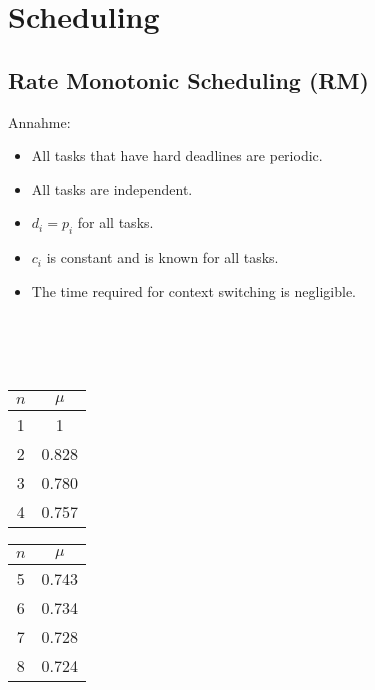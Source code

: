 \section{Scheduling}

\subsection{Rate Monotonic Scheduling (RM)}

Annahme:

\begin{itemize}
    \itemsep-.5em 
    \item All tasks that have hard deadlines are periodic.
    \item All tasks are independent.
    \item $d_i = p_i$ for all tasks.
    \item $c_i$ is constant and is known for all tasks.
    \item The time required for context switching is negligible.
\end{itemize}

\begin{minipage}[t]{.49\linewidth}
    \vspace{0pt}

    \\
    \\
    \\
\end{minipage}\hfill
\begin{minipage}[t]{.25\linewidth}
    \vspace{0pt}
    \begin{tabular}{ c|c }
        $n$ & $\mu$ \\
        \hline
        1 & 1     \\
        2 & 0.828 \\  
        3 & 0.780 \\
        4 & 0.757 \\
       \end{tabular}
\end{minipage}\hfill
\begin{minipage}[t]{.25\linewidth}
    \vspace{0pt}
    \begin{tabular}{ c|c }
        $n$ & $\mu$ \\
        \hline
        5 & 0.743 \\
        6 & 0.734 \\
        7 & 0.728 \\
        8 & 0.724 \\
       \end{tabular}
\end{minipage}

